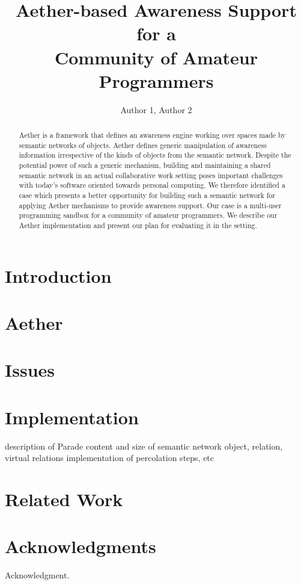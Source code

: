 \documentclass{ecscw2007}
\title{Aether-based Awareness Support for a\\Community of Amateur Programmers}
\author{Author 1, Author 2}
\affiliation{Institute 1, Country, Institute 2, Country}
\begin{document}
\maketitle
\thispagestyle{empty}


\begin{abstract}
Aether is a framework that defines an awareness engine working over spaces made by semantic networks of objects. Aether defines generic manipulation of awareness information irrespective of the kinds of objects from the semantic network. Despite the potential power of such a generic mechanism, building and maintaining a shared semantic network in an actual collaborative work setting poses important challenges with today's software oriented towards personal computing. We therefore identified a case which presents a better opportunity for building such a semantic network for applying Aether mechanisms to provide awareness support. Our case is a multi-user programming sandbox for a community of amateur programmers. We describe our Aether implementation and present our plan for evaluating it in the setting.
\end{abstract}

\section*{Introduction} 

\cite{Bowers91}

\section*{Aether} 

\section*{Issues} 

\section*{Implementation} 
description of Parade
content and size of semantic network
object, relation, virtual relations
implementation of percolation steps, etc

\section*{Related Work} 





\section*{Acknowledgments} 

{\footnotesize Acknowledgment. }




  
\end{document}
